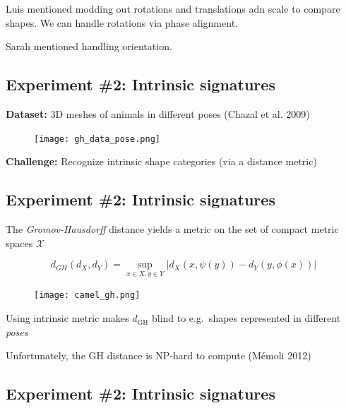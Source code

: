 \documentclass[
  letterpaper,
  DIV=11,
  numbers=noendperiod,
  oneside]{scrartcl}
\begin{document}
Luis mentioned modding out rotations and translations adn scale to
compare shapes. We can handle rotations via phase alignment.

Sarah mentioned handling orientation.

\hypertarget{experiment-2-intrinsic-signatures}{%
\subsection{Experiment \#2: Intrinsic
signatures}\label{experiment-2-intrinsic-signatures}}

\textbf{Dataset:} 3D meshes of animals in different poses (Chazal et al.
2009)

\begin{figure}

{\centering \texttt{[image: gh\_data\_pose.png]}

}

\end{figure}

\textbf{Challenge:} Recognize intrinsic shape categories (via a distance
metric)

\hypertarget{experiment-2-intrinsic-signatures-1}{%
\subsection{Experiment \#2: Intrinsic
signatures}\label{experiment-2-intrinsic-signatures-1}}

The \emph{Gromov-Hausdorff} distance yields a metric on the set of
compact metric spaces \(\mathcal{X}\)

\[
d_{GH}(d_X, d_Y) = \sup_{x \in X, y \in Y} \lvert d_X(x, \psi(y)) - d_Y(y, \phi(x))\rvert 
\]

\begin{figure}

{\centering \texttt{[image: camel\_gh.png]}

}

\end{figure}

Using intrinsic metric makes \(d_{\mathrm{GH}}\) blind to e.g.~shapes
represented in different \emph{poses}

Unfortunately, the GH distance is NP-hard to compute (Mémoli 2012)

\hypertarget{experiment-2-intrinsic-signatures-2}{%
\subsection{Experiment \#2: Intrinsic
signatures}\label{experiment-2-intrinsic-signatures-2}}
\end{document}
